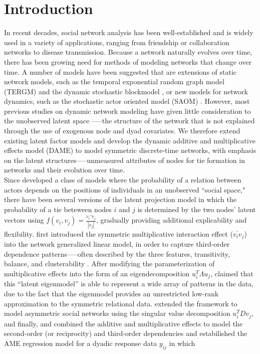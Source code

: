 \documentclass[a4paper]{article}
\begin{document}
	\section{Introduction} \label{sec: Introduction}
	In recent decades, social network analysis has been well-established and is widely used in a variety of applications, ranging from friendship or collaboration networks to disease transmission.  Because a network naturally evolves over time, there has been growing need for methods of modeling networks that change over time. A number of models have been suggested that are extensions of static network models, such as the temporal exponential random graph model (TERGM) \citep{hanneke2010discrete} and the dynamic stochastic blockmodel \citep{xu2013dynamic}, or new models for network dynamics, such as the stochastic actor oriented model (SAOM) \citep{snijders2010introduction}. However, most previous studies on dynamic network modeling have given little consideration to the unobserved latent space \citep{hoff2002latent}—--the structure of the network that is not explained through the use of exogenous node and dyad covariates. We therefore extend existing latent factor models \citep{hoff2005bilinear,hoff2009multiplicative,hoff2014amen,minhas2016inferential} and develop the dynamic additive and multiplicative effects model (DAME) to model symmetric discrete-time networks, with emphasis on the latent structures—--unmeasured attributes of nodes for tie formation in networks and their evolution over time.\\ \newline
	Since \cite{hoff2002latent} developed a class of models where the probability of a relation between actors depends on the positions of individuals in an unobserved ``social space," there have been several versions of the latent projection model in which the probability of a tie beteween nodes $i$ and $j$ is determined by the two nodes' latent vectors using $f(v_i, v_j)=\frac{v_i'v_j}{|v_j|}$, gradually providing additional explicability and flexibility. \cite{hoff2005bilinear} first introduced the symmetric multiplicative interaction effect ($v_i^\prime v_j$) into the network generalized linear model, in order to capture third-order dependence patterns—--often described by the three features, transitivity, balance, and clusterability \citep{hoff2005bilinear}. After modifying the parameterization of multiplicative effects into the form of an eigendecomposition $u_i^T\Lambda u_j$, \cite{hoff2008modeling} claimed that this ``latent eigenmodel'' is able to represent a wide array of patterns in the data, due to the fact that the eigenmodel provides an unrestricted low-rank approximation to the symmetric relational data. \cite{hoff2009multiplicative} extended the framework to model asymmetric social networks using the singular value decomposition $u_i^TDv_j$, and finally, \cite{hoff2014amen} and \cite{minhas2016inferential} combined the additive and multiplicative effects to model the second-order (or reciprocity) and third-order dependencies and estabilished the AME regression model for a dyadic response data $y_{ij}$ in which 
\end{document}
